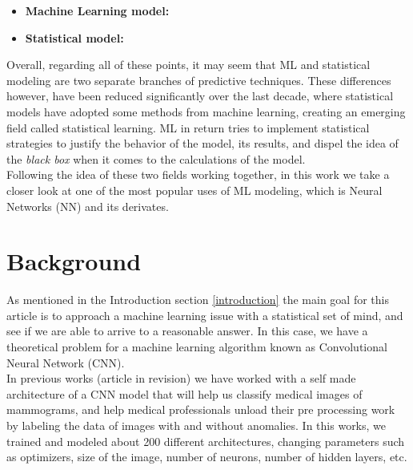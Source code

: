 \documentclass[review]{elsarticle}
\begin{document}
\begin{itemize} \label{ls1}
\item \textbf{Machine Learning model:} 
\item \textbf{Statistical model:} 
\end{itemize}

Overall, regarding all of these points, it may seem that ML and statistical modeling are two separate branches of predictive techniques. These differences however, have been reduced significantly over the last decade, where statistical models have adopted some methods from machine learning, creating an emerging field called statistical learning. ML in return tries to implement statistical strategies to justify the behavior of the model, its results, and dispel the idea of the \textit{black box} when it comes to the calculations of the model.\\

Following the idea of these two fields working together, in this work we take a closer look at one of the most popular uses of ML modeling, which is Neural Networks (NN) and its derivates. %

\section{Background}\label{background}

As mentioned in the Introduction section \ref{introduction} the main goal for this article is to approach a machine learning issue with a statistical set of mind, and see if we are able to arrive to a reasonable answer. In this case, we have a theoretical problem for a machine learning algorithm known as Convolutional Neural Network (CNN).  \\

In previous works \cite{tesis} (article in revision) we have worked with a self made architecture of a CNN model that will help us classify medical images of mammograms, and help medical professionals unload their pre processing work by labeling the data of images with and without anomalies. In this works, we trained and modeled about 200 different architectures, changing parameters such as optimizers, size of the image, number of neurons, number of hidden layers, etc.\\
\end{document}
